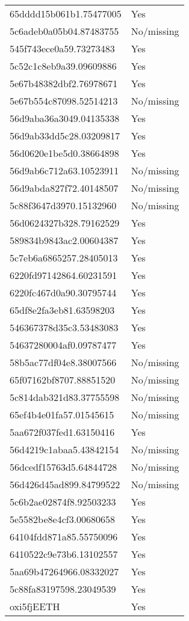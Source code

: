 \begin{tabular}{ll}
65dddd15b061b1.75477005 & Yes \\
5c6adeb0a05b04.87483755 & No/missing \\
545f743ece0a59.73273483 & Yes \\
5c52c1c8eb9a39.09609886 & Yes \\
5e67b48382dbf2.76978671 & Yes \\
5e67b554c87098.52514213 & No/missing \\
56d9aba36a3049.04135338 & Yes \\
56d9ab33dd5c28.03209817 & Yes \\
56d0620e1be5d0.38664898 & Yes \\
56d9ab6c712a63.10523911 & No/missing \\
56d9abda827f72.40148507 & No/missing \\
5c88f3647d3970.15132960 & No/missing \\
56d0624327b328.79162529 & Yes \\
589834b9843ac2.00604387 & Yes \\
5c7eb6a6865257.28405013 & Yes \\
6220fd97142864.60231591 & Yes \\
6220fc467d0a90.30795744 & Yes \\
65df8e2fa3eb81.63598203 & Yes \\
546367378d35c3.53483083 & Yes \\
54637280004af0.09787477 & Yes \\
58b5ac77df04e8.38007566 & No/missing \\
65f07162bf8707.88851520 & No/missing \\
5c814dab321d83.37755598 & No/missing \\
65ef4b4e01fa57.01545615 & No/missing \\
5aa672f037fed1.63150416 & Yes \\
56d4219c1abaa5.43842154 & No/missing \\
56dcedf15763d5.64844728 & No/missing \\
56d426d45ad899.84799522 & No/missing \\
5c6b2ae02874f8.92503233 & Yes \\
5e5582be8e4cf3.00680658 & Yes \\
64104fdd871a85.55750096 & Yes \\
6410522c9e73b6.13102557 & Yes \\
5aa69b47264966.08332027 & Yes \\
5c88fa83197598.23049539 & Yes \\
oxi5fjEETH & Yes \\

\end{tabular}
